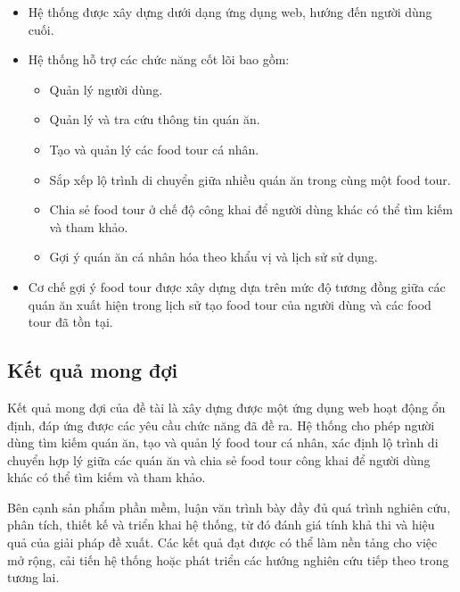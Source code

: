 \begin{itemize}[label=\textbullet]
    \item Hệ thống được xây dựng dưới dạng ứng dụng web, hướng đến người dùng cuối.
    \item Hệ thống hỗ trợ các chức năng cốt lõi bao gồm:
    \begin{itemize}[label=\textbullet]
    \item Quản lý người dùng.
    \item Quản lý và tra cứu thông tin quán ăn.
    \item Tạo và quản lý các food tour cá nhân.
    \item Sắp xếp lộ trình di chuyển giữa nhiều quán ăn trong cùng một food tour.
    \item Chia sẻ food tour ở chế độ công khai để người dùng khác có thể tìm kiếm và tham khảo.
    \item Gợi ý quán ăn cá nhân hóa theo khẩu vị và lịch sử sử dụng.
\end{itemize}
    
    \item Cơ chế gợi ý food tour được xây dựng dựa trên mức độ tương đồng giữa các quán ăn xuất hiện
trong lịch sử tạo food tour của người dùng và các food tour đã tồn tại.
\end{itemize}

\subsection{Kết quả mong đợi}
Kết quả mong đợi của đề tài là xây dựng được một ứng dụng web hoạt động ổn định, đáp ứng
được các yêu cầu chức năng đã đề ra. Hệ thống cho phép người dùng tìm kiếm quán ăn, tạo và
quản lý food tour cá nhân, xác định lộ trình di chuyển hợp lý giữa các quán ăn và chia sẻ food
tour công khai để người dùng khác có thể tìm kiếm và tham khảo.

Bên cạnh sản phẩm phần mềm, luận văn trình bày đầy đủ quá trình nghiên cứu, phân tích, thiết
kế và triển khai hệ thống, từ đó đánh giá tính khả thi và hiệu quả của giải pháp đề xuất. Các kết
quả đạt được có thể làm nền tảng cho việc mở rộng, cải tiến hệ thống hoặc phát triển các hướng
nghiên cứu tiếp theo trong tương lai.